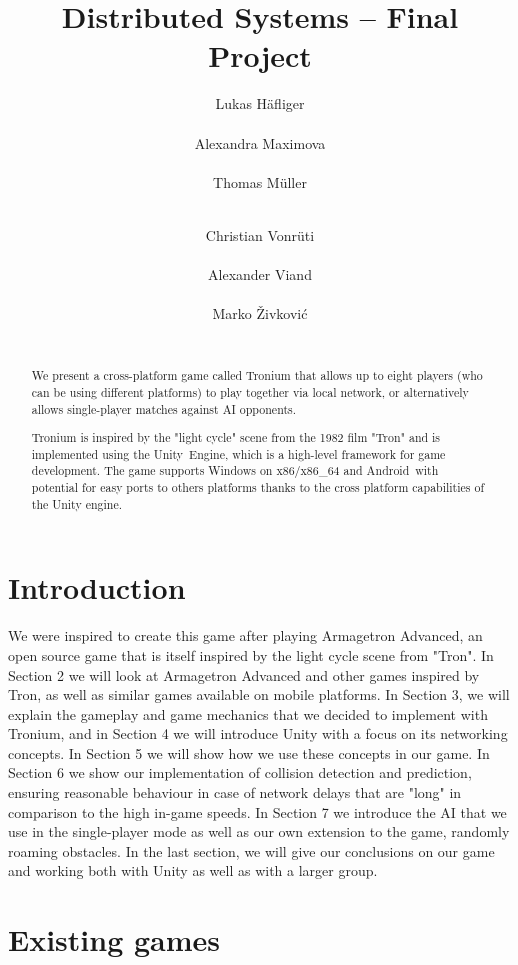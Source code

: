 \documentclass{report}
\title{Distributed Systems -- Final Project}
\author{
%
%
\alignauthor Lukas Häfliger\\
	\affaddr{ETH ID 11-916-376}\\
	\email{haelukas@student.ethz.ch}
\alignauthor Alexandra Maximova\\
 	\affaddr{ETH ID 09-913-534}\\
 	\email{amaximov@student.ethz.ch}
 	\alignauthor Thomas Müller\\
 	\affaddr{ETH ID 11-946-936}\\
 	\email{muelltho@student.ethz.ch} 
\and  %
\alignauthor Christian Vonrüti\\
 	\affaddr{ETH ID 11-930-914}\\
 	\email{cvonruet@student.ethz.ch} 
\alignauthor Alexander Viand\\
	\affaddr{ETH ID 09-940-131}\\
	\email{vianda@student.ethz.ch}
\alignauthor Marko Živković\\
	\affaddr{ETH ID 10-921-211}\\
	\email{markoz@student.ethz.ch}
}
\begin{document}
\maketitle

\begin{abstract}
We present a cross-platform game called Tronium that allows up to eight players (who can be using different platforms) to play together via local network, 
or alternatively allows single-player matches against AI opponents. 

Tronium is inspired by the "light cycle" scene from the 1982 film "Tron" and is implemented using the  Unity\textregistered   \ Engine, which is a high-level framework for game development.
The game supports Windows on x86/x86\_64 and Android\texttrademark \ 
with potential for easy ports to others platforms thanks to the cross platform capabilities of the Unity engine.

\end{abstract}

\section{Introduction}

We were inspired to create this game after playing Armagetron Advanced, an open source game that is itself inspired by the light cycle scene from "Tron". 
In Section 2 we will look at Armagetron Advanced and other games inspired by Tron, as well as similar games available on mobile platforms.
In Section 3, we will explain the gameplay and game mechanics that we decided to implement with Tronium, and in  Section 4 we will introduce Unity with a focus on its networking concepts. In Section 5 we will show how we use these concepts in our game. 
In Section 6 we show our implementation of collision detection and prediction, ensuring reasonable behaviour in case of network delays that are "long" in comparison to the high in-game speeds.
In Section 7 we introduce the AI that we use in the single-player mode as well as our own extension to the game,  randomly roaming obstacles.
In the last section, we will give our conclusions on our game and working both with Unity as well as with a larger group.

 
\section{Existing games}
\end{document}
